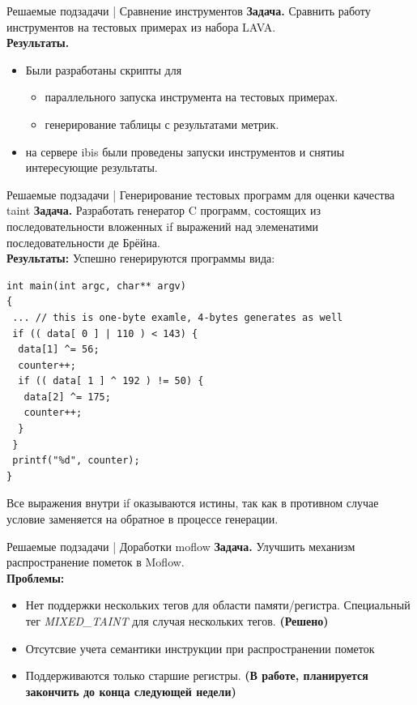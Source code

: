 \documentclass[10pt]{beamer}
\begin{document}
\begin{frame}{Решаемые подзадачи | Сравнение инструментов }
    \textbf{Задача.} Сравнить работу инструментов на тестовых примерах из набора LAVA.\\
    \textbf{Результаты.} 
    \begin{itemize}
        \item Были разработаны скрипты для
        \begin{itemize}
          \item параллельного запуска инструмента на тестовых примерах.
          \item генерирование таблицы с результатами метрик.
        \end{itemize}
        \item на сервере ibis были проведены запуски инструментов и снятиы интересующие результаты.
    \end{itemize}
\end{frame}

\begin{frame}[fragile]{Решаемые подзадачи | Генерирование тестовых программ для оценки качества taint}
    \textbf{Задача.} Разработать генератор C программ, состоящих из последовательности вложенных if выражений над элеменатими последовательности де Брёйна.\\
    \textbf{Результаты: } Успешно генерируются программы вида:
    \begin{lstlisting}
int main(int argc, char** argv)
{
 ... // this is one-byte examle, 4-bytes generates as well 
 if (( data[ 0 ] | 110 ) < 143) {
  data[1] ^= 56;
  counter++;
  if (( data[ 1 ] ^ 192 ) != 50) {
   data[2] ^= 175;
   counter++;
  }
 }
 printf("%d", counter);
}
\end{lstlisting}
Все выражения внутри if оказываются истины, так как в противном случае условие заменяется на обратное в процессе генерации.
\end{frame}

\begin{frame}{Решаемые подзадачи | Доработки moflow}
    \textbf{Задача.} Улучшить механизм распространение пометок в Moflow.\\
    \textbf{Проблемы: }
    \begin{itemize}
        \item Нет поддержки нескольких тегов для области памяти/регистра.
        Специальный тег \emph{MIXED\_TAINT} для случая нескольких тегов. \textbf{(Решено)}
        \item Отсутсвие учета семантики инструкции при распространении пометок
        \item Поддерживаются только старшие регистры. \textbf{(В работе, планируется закончить до конца следующей недели)}
    \end{itemize}
\end{frame}

\appendix

\end{document}

